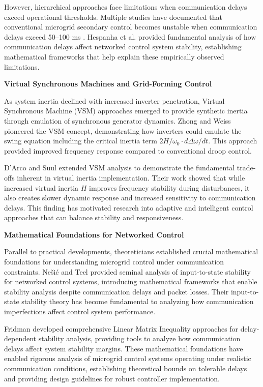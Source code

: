 \documentclass[12pt]{article}
\begin{document}
However, hierarchical approaches face limitations when communication delays exceed operational thresholds. Multiple studies have documented that conventional microgrid secondary control becomes unstable when communication delays exceed 50--100 ms \cite{guo2015,bidram2012,simpson2013}. Hespanha et al. \cite{hespanha2007} provided fundamental analysis of how communication delays affect networked control system stability, establishing mathematical frameworks that help explain these empirically observed limitations.

\textbf{Virtual Synchronous Machines and Grid-Forming Control}

As system inertia declined with increased inverter penetration, Virtual Synchronous Machine (VSM) approaches emerged to provide synthetic inertia through emulation of synchronous generator dynamics. Zhong and Weiss \cite{zhong2011} pioneered the VSM concept, demonstrating how inverters could emulate the swing equation including the critical inertia term $2H/\omega_0 \cdot d\Delta\omega/dt$. This approach provided improved frequency response compared to conventional droop control.

D'Arco and Suul \cite{darco2013} extended VSM analysis to demonstrate the fundamental trade-offs inherent in virtual inertia implementation. Their work showed that while increased virtual inertia $H$ improves frequency stability during disturbances, it also creates slower dynamic response and increased sensitivity to communication delays. This finding has motivated research into adaptive and intelligent control approaches that can balance stability and responsiveness.

\textbf{Mathematical Foundations for Networked Control}

Parallel to practical developments, theoreticians established crucial mathematical foundations for understanding microgrid control under communication constraints. Nešić and Teel \cite{nesic2004} provided seminal analysis of input-to-state stability for networked control systems, introducing mathematical frameworks that enable stability analysis despite communication delays and packet losses. Their input-to-state stability theory has become fundamental to analyzing how communication imperfections affect control system performance.

Fridman \cite{fridman2014} developed comprehensive Linear Matrix Inequality approaches for delay-dependent stability analysis, providing tools to analyze how communication delays affect system stability margins. These mathematical foundations have enabled rigorous analysis of microgrid control systems operating under realistic communication conditions, establishing theoretical bounds on tolerable delays and providing design guidelines for robust controller implementation.
\end{document}

